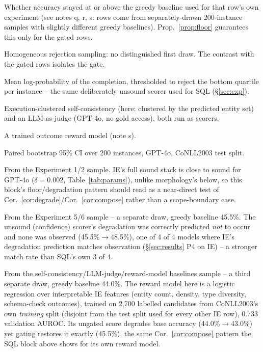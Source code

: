 \documentclass[11pt]{article}
\begin{document}
\begin{table}[t]
\begin{threeparttable}
\begin{tablenotes}[flushleft]
\item[c] Whether accuracy stayed at or above the greedy baseline used for that row's own experiment (see notes q, r, s: rows come from separately-drawn 200-instance samples with slightly different greedy baselines). Prop.~\ref{prop:floor} guarantees this only for the gated rows.
\item[e] Homogeneous rejection sampling: no distinguished first draw. The contrast with the gated rows isolates the gate.
\item[f] Mean log-probability of the completion, thresholded to reject the bottom quartile per instance -- the same deliberately unsound scorer used for SQL (\S\ref{sec:exp}).
\item[j] Execution-clustered self-consistency (here: clustered by the predicted entity set) and an LLM-as-judge (GPT-4o, no gold access), both run as scorers.
\item[l] A trained outcome reward model (note s).
\item[p] Paired bootstrap 95\% CI over 200 instances, GPT-4o, CoNLL2003 test split.
\item[q] From the Experiment 1/2 sample. IE's full sound stack is close to sound for GPT-4o ($\delta=0.002$, Table~\ref{tab:params}), unlike morphology's below, so this block's floor/degradation pattern should read as a near-direct test of Cor.~\ref{cor:degrade}/Cor.~\ref{cor:compose} rather than a scope-boundary case.
\item[r] From the Experiment 5/6 sample -- a separate draw, greedy baseline 45.5\%. The unsound (confidence) scorer's degradation was correctly predicted \emph{not} to occur and none was observed (45.5\%$\to$48.5\%), one of 4 of 4 models where IE's degradation prediction matches observation (\S\ref{sec:results} P4 on IE) -- a stronger match rate than SQL's own 3 of 4.
\item[s] From the self-consistency/LLM-judge/reward-model baselines sample -- a third separate draw, greedy baseline 44.0\%. The reward model here is a logistic regression over interpretable IE features (entity count, density, type diversity, schema-check outcomes), trained on 2{,}700 labelled candidates from CoNLL2003's own \emph{training} split (disjoint from the test split used for every other IE row), 0.733 validation AUROC. Its ungated score degrades base accuracy (44.0\%$\to$43.0\%) yet gating restores it exactly (45.5\%), the same Cor.~\ref{cor:compose} pattern the SQL block above shows for its own reward model.
\end{tablenotes}
\end{threeparttable}
\caption*{\textbf{IE, GPT-4o} (CoNLL2003 test split; sound stack $=$ \texttt{parses}$\wedge$\texttt{required\_fields}$\wedge$\texttt{schema\_valid}$\wedge$\texttt{no\_overlap}). All three deferred baselines are floor-safe here, matching SQL's pattern with no exception across all 12 (scorer, model) cells tested for IE overall (\S\ref{sec:results}).}


\end{table}
\end{document}
